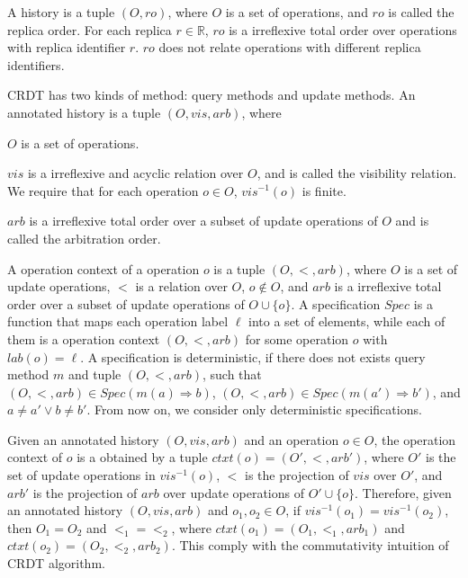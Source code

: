 A history is a tuple $(O,\mathit{ro})$, where $O$ is a set of operations, and $\mathit{ro}$ is called the replica order. For each replica $r \in \mathbb{R}$, $\mathit{ro}$ is a irreflexive total order over operations with replica identifier $r$. $\mathit{ro}$ does not relate operations with different replica identifiers. %

CRDT has two kinds of method: query methods and update methods. An annotated history is a tuple $(O,\mathit{vis},\mathit{arb})$, where

\begin{itemize}
\setlength{\itemsep}{0.5pt}
\item[-] $O$ is a set of operations.

\item[-] $\mathit{vis}$ is a irreflexive and acyclic relation over $O$, and is called the visibility relation. We require that for each operation $o \in O$, $\mathit{vis}^{-1}(o)$ is finite.

{\color {red} 
\item[-] $\mathit{arb}$ is a irreflexive total order over a subset of update operations of $O$ and is called the arbitration order. 
}
\end{itemize}

A operation context of a operation $o$ is a tuple $(O,<,\mathit{arb})$, where $O$ is a set of update operations, $<$ is a relation over $O$, $o \notin O$, %
{\color {red} and $\mathit{arb}$ is a irreflexive total order over a subset of update operations of $O \cup \{ o \}$.} A specification $Spec$ is a function that maps each operation label $\ell$ into a set of elements, while each of them is a operation context $(O,<,\mathit{arb})$ for some operation $o$ with $lab(o) = \ell$. A specification is deterministic, if there does not exists query method $m$ and tuple $(O,<,\mathit{arb})$, such that $(O,<,\mathit{arb}) \in Spec(m(a) \Rightarrow b)$, $(O,<,\mathit{arb}) \in Spec(m(a') \Rightarrow b')$, and $a \neq a' \vee b \neq b'$. From now on, we consider only deterministic specifications.

Given an annotated history $(O,\mathit{vis},\mathit{arb})$ and an operation $o \in O$, the operation context of $o$ is a obtained by a tuple $ctxt(o)=(O',<,\mathit{arb}')$, where $O'$ is the set of update operations in $\mathit{vis}^{-1}(o)$, $<$ is the projection of $\mathit{vis}$ over $O'$, and $\mathit{arb}'$ is the projection of $\mathit{arb}$ over update operations of $O' \cup \{ o \}$. Therefore, given an annotated history $(O,\mathit{vis},\mathit{arb})$ and $o_1,o_2 \in O$, if $\mathit{vis}^{-1}(o_1) = \mathit{vis}^{-1}(o_2)$, then $O_1 = O_2$ and $<_1 = <_2$, where $ctxt(o_1)=(O_1,<_1,\mathit{arb}_1)$ and $ctxt(o_2)=(O_2,<_2,\mathit{arb}_2)$. This comply with the commutativity intuition of CRDT algorithm.

